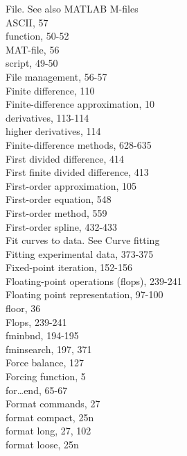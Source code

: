 \documentclass[../main.tex]{subfiles}
\begin{document}
\begin{multicols}{3}
    File. See also MATLAB M-files\\
    \hspace*{3mm}ASCII, 57\\
    \hspace*{3mm}function, 50-52\\
    \hspace*{3mm}MAT-file, 56\\
    \hspace*{3mm}script, 49-50\\
    File management, 56-57\\
    Finite difference, 110\\
    Finite-difference approximation, 10\\
    \hspace*{3mm}derivatives, 113-114\\
    \hspace*{3mm}higher derivatives, 114\\
    Finite-difference methods, 628-635\\
    First divided difference, 414\\
    First finite divided difference, 413\\
    First-order approximation, 105\\
    First-order equation, 548\\
    First-order method, 559\\
    First-order spline, 432-433\\
    Fit curves to data. See Curve fitting\\
    Fitting experimental data, 373-375\\
    Fixed-point iteration, 152-156\\
    Floating-point operations (flops), 239-241\\
    Floating point representation, 97-100\\
    floor, 36\\
    Flops, 239-241\\
    fminbnd, 194-195\\
    fminsearch, 197, 371\\
    Force balance, 127\\
    Forcing function, 5\\
    for\ldots end, 65-67\\
    Format commands, 27\\
    format compact, 25n\\
    format long, 27, 102\\
    format loose, 25n\\

\end{multicols}
\end{document}
